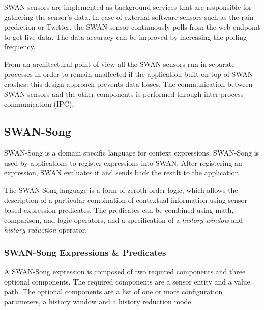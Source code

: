SWAN sensors are implemented as background services that are responsible for gathering the sensor's data. In case of external software sensors such as the rain prediction or Twitter, the SWAN sensor continuously polls from the web endpoint to get live data. The data accuracy can be improved by increasing the polling frequency. 

From an architectural point of view all the SWAN sensors run in separate processes in order to remain unaffected if the application built on top of SWAN crashes: this design approach prevents data losses. The communication between SWAN sensors and the other components is performed through inter-process communication (IPC).

\subsection{SWAN-Song}
SWAN-Song \cite{swansong} is a domain specific language
for context expressions. SWAN-Song is used by applications to register expressions into SWAN. After registering an expression, SWAN evaluates it and sends back the result to the application. 

The SWAN-Song language is a form of zeroth-order logic, which allows the description of a particular combination of contextual information using sensor based expression predicates. The predicates can be combined using math, comparison, and logic operators, and a specification of a \emph{history window} and \emph{history reduction} operator.  

\subsubsection{SWAN-Song Expressions \& Predicates}
A SWAN-Song expression is composed of two required components and three optional components. The required components are a sensor entity and a value path. The optional components are a list of one or more configuration parameters, a history window and a history reduction mode.

